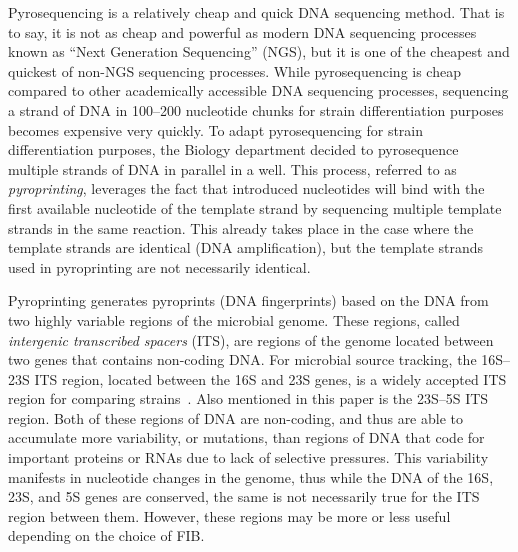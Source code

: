 \documentclass[12pt]{ucthesis}
\begin{document}
      Pyrosequencing is a relatively cheap and quick DNA sequencing method.
      That is to say, it is not as cheap and powerful as modern DNA sequencing
      processes known as ``Next Generation Sequencing'' (NGS), but it is one of
      the cheapest and quickest of non-NGS sequencing processes. While
      pyrosequencing is cheap compared to other academically accessible DNA
      sequencing processes, sequencing a strand of DNA in 100--200 nucleotide
      chunks for strain differentiation purposes becomes expensive very
      quickly. To adapt pyrosequencing for strain differentiation purposes, the
      Biology department decided to pyrosequence multiple strands of DNA in
      parallel in a well. This process, referred to as \textit{pyroprinting},
      leverages the fact that introduced nucleotides will bind with the first
      available nucleotide of the template strand by sequencing multiple
      template strands in the same reaction. This already takes place in the
      case where the template strands are identical (DNA amplification), but
      the template strands used in pyroprinting are not necessarily identical.

      Pyroprinting generates pyroprints (DNA fingerprints) based on the DNA
      from two highly variable regions of the microbial genome. These regions,
      called \textit{intergenic transcribed spacers} (ITS), are regions of the
      genome located between two genes that contains non-coding DNA. For
      microbial source tracking, the 16S--23S ITS region, located between the
      16S and 23S genes, is a widely accepted ITS region for comparing
      strains~\cite{Boyer:ITS, Roth:Phylo, Tyler:Primers}. Also mentioned in
      this paper is the 23S--5S ITS region. Both of these regions of DNA are
      non-coding, and thus are able to accumulate more variability, or
      mutations, than regions of DNA that code for important proteins or RNAs
      due to lack of selective pressures. This variability manifests in
      nucleotide changes in the genome, thus while the DNA of the 16S, 23S, and
      5S genes are conserved, the same is not necessarily true for the ITS
      region between them. However, these regions may be more or less useful
      depending on the choice of FIB.
      
\end{document}
